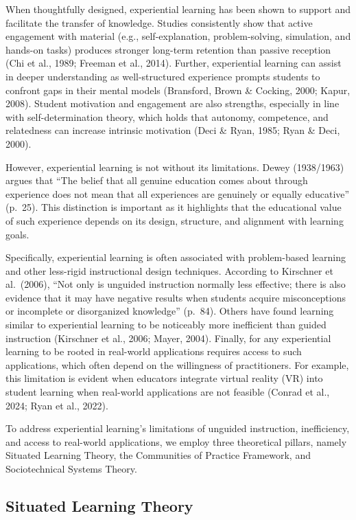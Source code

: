 \documentclass[
  12pt]{article}
\begin{document}
When thoughtfully designed, experiential learning has been shown to
support and facilitate the transfer of knowledge. Studies consistently
show that active engagement with material (e.g., self-explanation,
problem-solving, simulation, and hands-on tasks) produces stronger
long-term retention than passive reception (Chi et al., 1989; Freeman et
al., 2014). Further, experiential learning can assist in deeper
understanding as well-structured experience prompts students to confront
gaps in their mental models (Bransford, Brown \& Cocking, 2000; Kapur,
2008). Student motivation and engagement are also strengths, especially
in line with self-determination theory, which holds that autonomy,
competence, and relatedness can increase intrinsic motivation (Deci \&
Ryan, 1985; Ryan \& Deci, 2000).

However, experiential learning is not without its limitations. Dewey
(1938/1963) argues that ``The belief that all genuine education comes
about through experience does not mean that all experiences are
genuinely or equally educative'' (p.~25). This distinction is important
as it highlights that the educational value of such experience depends
on its design, structure, and alignment with learning goals.

Specifically, experiential learning is often associated with
problem-based learning and other less-rigid instructional design
techniques. According to Kirschner et al.~(2006), ``Not only is unguided
instruction normally less effective; there is also evidence that it may
have negative results when students acquire misconceptions or incomplete
or disorganized knowledge'' (p.~84). Others have found learning similar
to experiential learning to be noticeably more inefficient than guided
instruction (Kirschner et al., 2006; Mayer, 2004). Finally, for any
experiential learning to be rooted in real-world applications requires
access to such applications, which often depend on the willingness of
practitioners. For example, this limitation is evident when educators
integrate virtual reality (VR) into student learning when real-world
applications are not feasible (Conrad et al., 2024; Ryan et al., 2022).

To address experiential learning's limitations of unguided instruction,
inefficiency, and access to real-world applications, we employ three
theoretical pillars, namely Situated Learning Theory, the Communities of
Practice Framework, and Sociotechnical Systems Theory.

\subsection{Situated Learning Theory}\label{situated-learning-theory}
\end{document}
